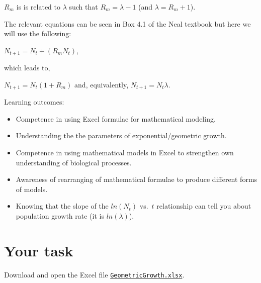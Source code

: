 \documentclass[
  a4paper]{book}
\providecommand{\tightlist}{%
  \setlength{\itemsep}{0pt}\setlength{\parskip}{0pt}}
\begin{document}
\(R_m\) is is related to \(\lambda\) such that \(R_m = \lambda - 1\) (and \(\lambda = R_m + 1\)).

The relevant equations can be seen in Box 4.1 of the Neal textbook but here we will use the following:

\(N_{t+1} = N_t + (R_m N_t)\),

which leads to,

\(N_{t+1} = N_t (1 + R_m)\) and, equivalently, \(N_{t+1} = N_t \lambda\).

\begin{do-something}
Learning outcomes:

\begin{itemize}
\tightlist
\item
  Competence in using Excel formulae for mathematical modeling.
\item
  Understanding the the parameters of exponential/geometric growth.
\item
  Competence in using mathematical models in Excel to strengthen own
  understanding of biological processes.
\item
  Awareness of rearranging of mathematical formulae to produce different
  forms of models.
\item
  Knowing that the slope of the \(ln(N_t)\) vs.~\(t\) relationship can
  tell you about population growth rate (it is \(ln(\lambda)\)).
\end{itemize}
\end{do-something}

\section{Your task}\label{your-task-2}

Download and open the Excel file \href{https://www.dropbox.com/s/xxx05sckvop5i52/GeometricGrowth.xlsx?dl=1}{\texttt{GeometricGrowth.xlsx}}.
\end{document}
